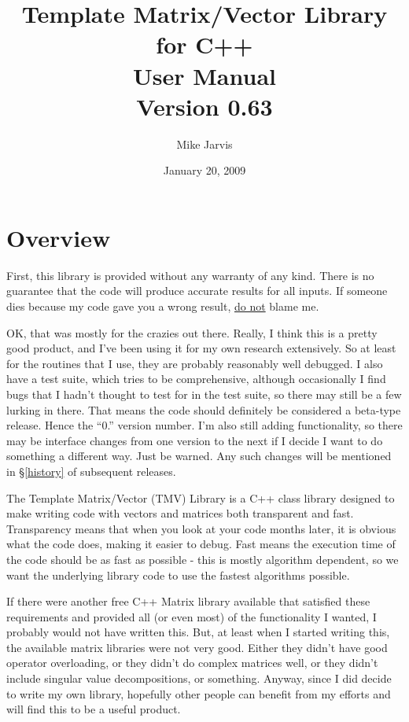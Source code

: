 \documentclass[twoside,letterpaper,11pt]{article}
\newcommand{\tmvversion}{0.63}
\begin{document}
\title{Template Matrix/Vector Library for C++ \\ User Manual \\ Version \tmvversion}
\author{Mike Jarvis}
\date{January 20, 2009}
\maketitle

\tableofcontents

\newpage
\section{Overview}

First, this library is provided without any warranty of any kind.  There is no guarantee
that the code will produce accurate results for all inputs.  If someone dies because
my code gave you a wrong result, \underline{do not} blame me.

OK, that was mostly for the crazies out there.  Really, I think this is a pretty good 
product, and I've been using it for my own research extensively.  So at least 
for the routines that I use, they are probably reasonably well debugged.
I also have a test suite, which tries to be comprehensive, although
occasionally I find bugs that I hadn't thought to test for in the test suite, so 
there may still be a few lurking in there.  That means the code should definitely be considered
a beta-type release.  Hence the ``0.'' version number.  I'm also still adding functionality,
so there may be interface changes from one version to the next if I decide I 
want to do something a different way.  Just be warned.  Any such changes will be 
mentioned in \S\ref{history} of subsequent releases.

The Template Matrix/Vector (TMV) Library is a C++ class library designed to make
writing code with vectors and matrices both transparent and fast.  Transparency 
means that when you look at your code months later, it is obvious what the code
does, making it easier to debug.  Fast means the execution time of the code should
be as fast as possible - this is mostly algorithm dependent, so we want the 
underlying library code to use the fastest algorithms possible.

If there were another free C++ Matrix library available that satisfied these requirements
and provided all (or even most) of the functionality I wanted, I probably would
not have written this.  But, at least when I started writing this, the available matrix libraries
were not very good.  Either they didn't have good operator overloading, or they 
didn't do complex matrices well, or they didn't include singular value decompositions,
or something.  Anyway, since I did decide to write 
my own library, hopefully other people can benefit from my efforts and will find 
this to be a useful product.
\end{document}
